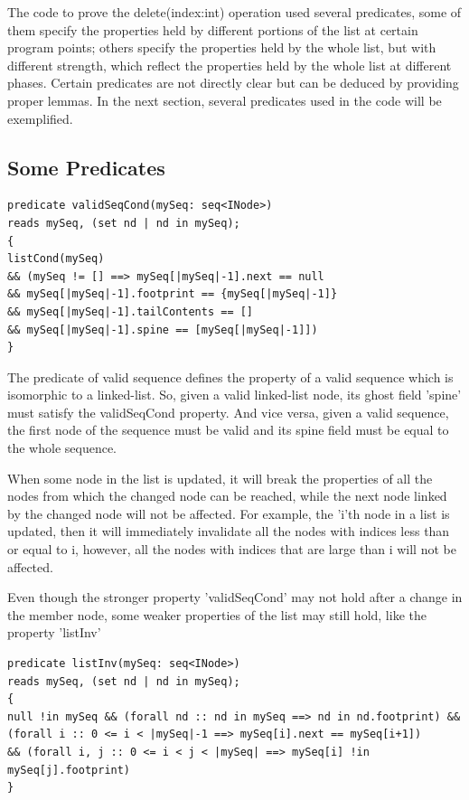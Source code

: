 \bigskip

The code to prove the delete(index:int) operation used several predicates, some of them specify the properties held by different portions of the list at certain program points; others specify the properties held by the whole list, but with different strength, which reflect the properties held by the whole list at different phases. Certain predicates are not directly clear but can be deduced by providing proper lemmas. In the next section, several predicates used in the code will be exemplified.

\subsection*{Some Predicates}
\begin{lstlisting}[caption=valid sequence predicate]
predicate validSeqCond(mySeq: seq<INode>)
reads mySeq, (set nd | nd in mySeq);
{
listCond(mySeq) 
&& (mySeq != [] ==> mySeq[|mySeq|-1].next == null
&& mySeq[|mySeq|-1].footprint == {mySeq[|mySeq|-1]}
&& mySeq[|mySeq|-1].tailContents == []
&& mySeq[|mySeq|-1].spine == [mySeq[|mySeq|-1]])
}
\end{lstlisting}

The predicate of valid sequence defines the property of a valid sequence which is isomorphic to a linked-list. So, given a valid linked-list node, its ghost field 'spine' must satisfy the validSeqCond property. And vice versa, given a valid sequence, the first node of the sequence must be valid and its spine field must be equal to the whole sequence.

\bigskip
When some node in the list is updated, it will break the properties of all the nodes from which the changed node can be reached, while the next node linked by the changed node will not be affected. For example, the 'i'th node in a list is updated, then it will immediately invalidate all the nodes with indices less than or equal to i, however, all the nodes with indices that are large than i will not be affected.

\bigskip
Even though the stronger property 'validSeqCond' may not hold after a change in the member node, some weaker properties of the list may still hold, like the property 'listInv'\\

\begin{lstlisting}[caption=list invariant property]
predicate listInv(mySeq: seq<INode>)
reads mySeq, (set nd | nd in mySeq);
{
null !in mySeq && (forall nd :: nd in mySeq ==> nd in nd.footprint) &&
(forall i :: 0 <= i < |mySeq|-1 ==> mySeq[i].next == mySeq[i+1])
&& (forall i, j :: 0 <= i < j < |mySeq| ==> mySeq[i] !in mySeq[j].footprint)
}
\end{lstlisting}

